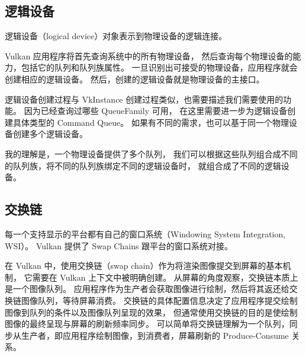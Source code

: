 \documentclass[a4paper, 12pt]{ctexart}
\begin{document}
\clearpage
\subsection{逻辑设备}
    逻辑设备（logical device）对象表示到物理设备的逻辑连接。

    Vulkan 应用程序将首先查询系统中的所有物理设备，
    然后查询每个物理设备的能力，包括它的队列和队列族属性。
    一旦识别出可接受的物理设备，应用程序就会创建相应的逻辑设备。
    然后，创建的逻辑设备就是物理设备的主接口。


    逻辑设备创建过程与 VkInstance 创建过程类似，也需要描述我们需要使用的功能。
    因为已经查询过哪些 QueueFamily 可用，
    在这里需要进一步为逻辑设备创建具体类型的 Command Queue。
    如果有不同的需求，也可以基于同一个物理设备创建多个逻辑设备。

    我的理解是，一个物理设备提供了多个队列，
    我们可以根据这些队列组合成不同的队列族，将不同的队列族绑定不同的逻辑设备时，
    就组合成了不同的逻辑设备。


\clearpage
\subsection{交换链}
    每一个支持显示的平台都有自己的窗口系统（Windowing System Integration, WSI）。
    Vulkan 提供了 Swap Chains 跟平台的窗口系统对接。
    
    在 Vulkan 中，使用交换链（swap chain）作为将渲染图像提交到屏幕的基本机制，
    它需要在 Vulkan 上下文中被明确创建。
    从屏幕的角度观察，交换链本质上是一个图像队列。
    应用程序作为生产者会获取图像进行绘制，然后将其返还给交换链图像队列，等待屏幕消费。
    交换链的具体配置信息决定了应用程序提交绘制图像到队列的条件以及图像队列呈现的效果，
    但通常使用交换链的目的是使绘制图像的最终呈现与屏幕的刷新频率同步。
    可以简单将交换链理解为一个队列，同步从生产者，即应用程序绘制图像，到消费者，屏幕刷新的 Produce-Consume 关系。
\end{document}
